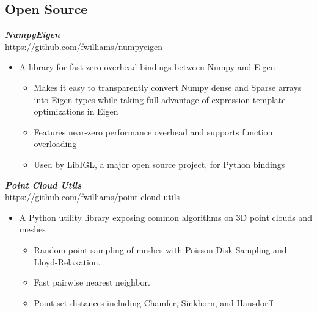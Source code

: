 \documentclass[line,10pt]{res}
\newcommand{\resumetitlemar}{0.5em}
\begin{document}
\begin{resume}
\vspace{0.2em}
\section{\Large \sc \textbf Open Source}
\vspace{0.5em}

{\sl \textbf{NumpyEigen}}\\
\url{https://github.com/fwilliams/numpyeigen}
\vspace{\resumetitlemar}
\begin{itemize} \itemsep -2pt
\item A library for fast zero-overhead bindings between Numpy and Eigen
\vspace{-0.4em}
\begin{itemize} \itemsep -2pt
\item Makes it easy to transparently convert Numpy dense and Sparse arrays into Eigen types while taking full advantage of expression template optimizations in Eigen
\item Features near-zero performance overhead and supports function overloading
\item Used by LibIGL, a major open source project, for Python bindings 
\end{itemize}
\end{itemize}

{\sl \textbf{Point Cloud Utils}}\\
\url{https://github.com/fwilliams/point-cloud-utils}
\vspace{\resumetitlemar}
\begin{itemize} \itemsep -2pt
\item A Python utility library exposing common algorithms on 3D point clouds and meshes
\vspace{-0.4em}
\begin{itemize} \itemsep -2pt
\item Random point sampling of meshes with Poisson Disk Sampling and Lloyd-Relaxation.
\item Fast pairwise nearest neighbor.
\item Point set distances including Chamfer, Sinkhorn, and Hausdorff.
\end{itemize}
\end{itemize}


\end{resume}
\end{document}
